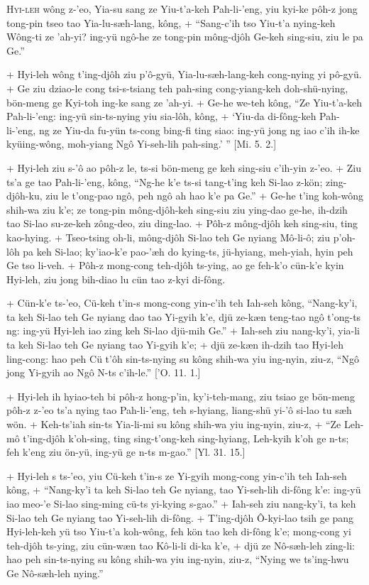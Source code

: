 \header
\lettrine{H}{yi-leh} wông z-'eo, Yia-su sang ze Yiu-t'a-keh Pah-li-'eng, yiu kyi-ke pôh-z jong tong-pin tseo tao Yia-lu-sæh-lang, kông,
+	``Sang-c'ih tso Yiu-t'a nying-keh Wông-ti ze 'ah-yi? ing-yü ngô-he ze tong-pin mông-djôh Ge-keh sing-siu, ziu le pa Ge.''
\par
+	Hyi-leh wông t'ing-djôh ziu p'ô-gyü, Yia-lu-sæh-lang-keh cong-nying yi pô-gyü.
+	Ge ziu dziao-le cong tsi-s-tsiang teh pah-sing cong-yiang-keh doh-shü-nying, bön-meng ge Kyi-toh ing-ke sang ze 'ah-yi.
+	Ge-he we-teh kông, ``Ze Yiu-t'a-keh Pah-li-'eng: ing-yü sin-ts-nying yiu sia-lôh, kông,
+	`Yiu-da di-fông-keh Pah-li-'eng, ng ze Yiu-da fu-yün ts-cong bing-fi ting siao: ing-yü jong ng iao c'ih ih-ke kyüing-wông, moh-yiang Ngô Yi-seh-lih pah-sing.' '' [Mi. 5. 2.]
\par
+	Hyi-leh ziu s-'ô ao pôh-z le, ts-si bön-meng ge keh sing-siu c'ih-yin z-'eo.
+	Ziu ts'a ge tao Pah-li-'eng, kông, ``Ng-he k'e ts-si tang-t'ing keh Si-lao z-kön; zing-djôh-ku, ziu le t'ong-pao ngô, peh ngô ah hao k'e pa Ge.''
+	Ge-he t'ing koh-wông shih-wa ziu k'e; ze tong-pin mông-djôh-keh sing-siu ziu ying-dao ge-he, ih-dzih tao Si-lao su-ze-keh zông-deo, ziu ding-lao.
+	Pôh-z mông-djôh keh sing-siu, ting kao-hying.
+	Tseo-tsing oh-li, mông-djôh Si-lao teh Ge nyiang Mô-li-ô; ziu p'oh-lôh pa keh Si-lao; ky'iao-k'e pao-'æh do kying-ts, jü-hyiang, meh-yiah, hyin peh Ge tso li-veh.
+	Pôh-z mong-cong teh-djôh ts-ying, ao ge feh-k'o cün-k'e kyin Hyi-leh, ziu jong bih-diao lu cün tao z-kyi di-fông.
\par
+	Cün-k'e ts-'eo, Cü-keh t'in-s mong-cong yin-c'ih teh Iah-seh kông, ``Nang-ky'i, ta keh Si-lao teh Ge nyiang dao tao Yi-gyih k'e, djü ze-kæn teng-tao ngô t'ong-ts ng: ing-yü Hyi-leh iao zing keh Si-lao djü-mih Ge.''
+	Iah-seh ziu nang-ky'i, yia-li ta keh Si-lao teh Ge nyiang tao Yi-gyih k'e;
+	djü ze-kæn ih-dzih tao Hyi-leh ling-cong: hao peh Cü t'ôh sin-ts-nying su kông shih-wa yiu ing-nyin, ziu-z, ``Ngô jong Yi-gyih ao Ngô N-ts c'ih-le.'' ['O. 11. 1.]
\par
+	Hyi-leh ih hyiao-teh bi pôh-z hong-p'in, ky'i-teh-mang, ziu tsiao ge bön-meng pôh-z z-'eo ts'a nying tao Pah-li-'eng, teh s-hyiang, liang-shü yi-'ô si-lao tu sæh wön.
+	Keh-ts'iah sin-ts Yia-li-mi su kông shih-wa yiu ing-nyin, ziu-z,
+	``Ze Leh-mô t'ing-djôh k'oh-sing, ting sing-t'ong-keh sing-hyiang, Leh-kyih k'oh ge n-ts; feh k'eng ziu ön-yü, ing-yü ge n-ts m-gao.'' [Yl. 31. 15.]
\par
+	Hyi-leh s ts-'eo, yiu Cü-keh t'in-s ze Yi-gyih mong-cong yin-c'ih teh Iah-seh kông,
+	``Nang-ky'i ta keh Si-lao teh Ge nyiang, tao Yi-seh-lih di-fông k'e: ing-yü iao meo-'e Si-lao sing-ming cü-ts yi-kying s-gao.''
+	Iah-seh ziu nang-ky'i, ta keh Si-lao teh Ge nyiang tao Yi-seh-lih di-fông.
+	T'ing-djôh Ô-kyi-lao tsih ge pang Hyi-leh-keh yü tso Yiu-t'a koh-wông, feh kön tao keh di-fông k'e; mong-cong yi teh-djôh ts-ying, ziu cün-wæn tao Kô-li-li di-ka k'e,
+	djü ze Nô-sæh-leh zing-li: hao peh sin-ts-nying su kông shih-wa yiu ing-nyin, ziu-z, ``Nying we ts'ing-hwu Ge Nô-sæh-leh nying.''



